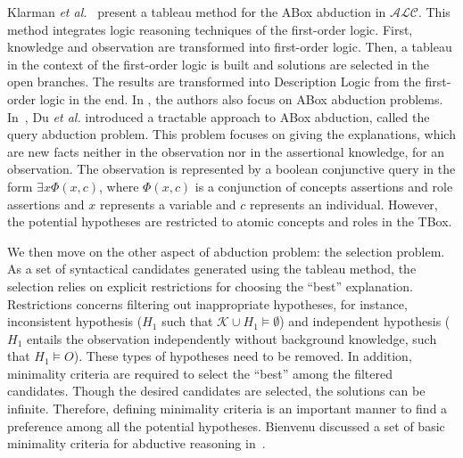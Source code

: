 \documentclass{article}
\begin{document}
Klarman \textit{et al.}~\cite{klarman2011abox} present a tableau method for the ABox abduction in $\mathcal{ALC}$.
This method integrates logic reasoning techniques of the first-order logic. First, knowledge and observation are
transformed into first-order logic. Then, a tableau in the context of the first-order logic is built and solutions
are selected in the open branches. The results are transformed into Description Logic from the first-order logic in the end.
In \cite{du2011towards,du2014tractable}, the authors also focus on ABox abduction problems. 
In~\cite{du2014tractable}, Du \textit{et al.} introduced a tractable approach to ABox abduction, called the query abduction problem.
This problem focuses on giving the explanations, which are new facts neither in the observation nor in the assertional knowledge, for an observation.
The observation is represented by a boolean conjunctive query in the form $\exists x\Phi(x,c)$, where $\Phi(x,c)$ is a conjunction of concepts
assertions and role assertions and $x$ represents a variable and $c$ represents an individual.
However, the potential hypotheses are restricted to atomic concepts and roles in the TBox.



We then move on the other aspect of abduction problem: the selection problem.
As a set of syntactical candidates generated using the tableau method, the selection relies on explicit restrictions for choosing the ``best'' explanation.
Restrictions concerns filtering out inappropriate hypotheses,
for instance, inconsistent hypothesis ($H_1$ such that $\mathcal{K}\cup H_1\vDash \emptyset$) and independent hypothesis ($H_1$ entails the observation independently without background knowledge,
such that $H_1\vDash O$).
These types of hypotheses need to be removed.
In addition, minimality criteria are required to select the ``best'' among the filtered candidates.
Though the desired candidates are selected, the solutions can be infinite.
Therefore, defining minimality criteria is an important manner to find a preference among all the potential hypotheses.
Bienvenu  discussed a set of basic minimality criteria for abductive reasoning in~\cite{bienvenu08complexity}.
\end{document}
